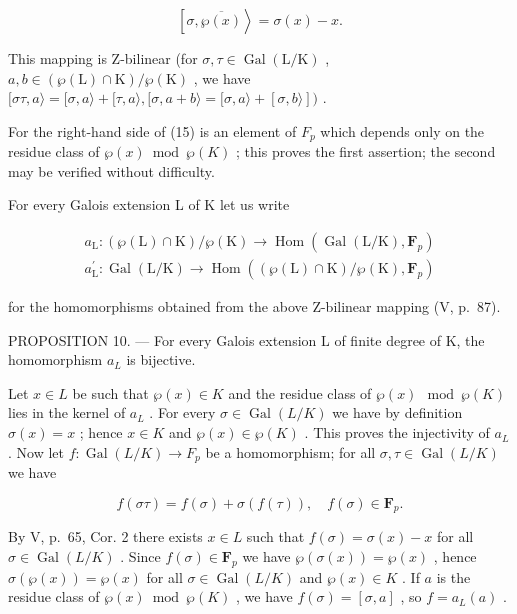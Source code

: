 \[
\left[ \sigma , \overline {{{\wp (x)}}} \right\rangle = \sigma (x) - x.\tag{15}
\]

This mapping is Z-bilinear (for \(\sigma, \tau \in \operatorname{Gal}(\mathrm{L} / \mathrm{K})\) , \(a, b \in (\wp(\mathrm{L}) \cap \mathrm{K}) / \wp(\mathrm{K})\) , we have \([\sigma \tau, a\rangle = [\sigma, a\rangle + [\tau, a\rangle, [\sigma, a + b\rangle = [\sigma, a\rangle + [\sigma, b\rangle])\) .

For the right-hand side of (15) is an element of \(F_{p}\) which depends only on the residue class of \(\wp(x)\bmod\wp(K)\) ; this proves the first assertion; the second may be verified without difficulty.

For every Galois extension L of K let us write

\[
\begin{array}{l} a _ {\mathrm{L}} \colon (\wp (\mathrm{L}) \cap \mathrm{K}) / \wp (\mathrm{K}) \to \operatorname{Hom} \left(\operatorname{Gal} (\mathrm{L} / \mathrm{K}), \mathbf {F} _ {p}\right) \\ a _ {\mathrm{L}} ^ {\prime} \colon \operatorname{Gal} (\mathrm{L} / \mathrm{K}) \to \operatorname{Hom} \left((\wp (\mathrm{L}) \cap \mathrm{K}) / \wp (\mathrm{K}), \mathbf {F} _ {p}\right) \end{array}
\]

for the homomorphisms obtained from the above Z-bilinear mapping (V, p.~87).

PROPOSITION 10. --- For every Galois extension L of finite degree of K, the homomorphism \(a_{L}\) is bijective.

Let \(x \in L\) be such that \(\wp(x) \in K\) and the residue class of \(\wp(x) \mod \wp(K)\) lies in the kernel of \(a_L\) . For every \(\sigma \in \operatorname{Gal}(L/K)\) we have by definition \(\sigma(x) = x\) ; hence \(x \in K\) and \(\wp(x) \in \wp(K)\) . This proves the injectivity of \(a_L\) . Now let \(f: \operatorname{Gal}(L/K) \to F_p\) be a homomorphism; for all \(\sigma, \tau \in \operatorname{Gal}(L/K)\) we have

\[
f (\sigma \tau) = f (\sigma) + \sigma (f (\tau)), \quad f (\sigma) \in \mathbf {F} _ {p}.
\]

By V, p.~65, Cor. 2 there exists \(x \in L\) such that \(f(\sigma) = \sigma(x) - x\) for all \(\sigma \in \operatorname{Gal}(L/K)\) . Since \(f(\sigma) \in \mathbf{F}_p\) we have \(\wp(\sigma(x)) = \wp(x)\) , hence \(\sigma(\wp(x)) = \wp(x)\) for all \(\sigma \in \operatorname{Gal}(L/K)\) and \(\wp(x) \in K\) . If \(a\) is the residue class of \(\wp(x) \bmod \wp(K)\) , we have \(f(\sigma) = [\sigma, a]\) , so \(f = a_L(a)\) .

